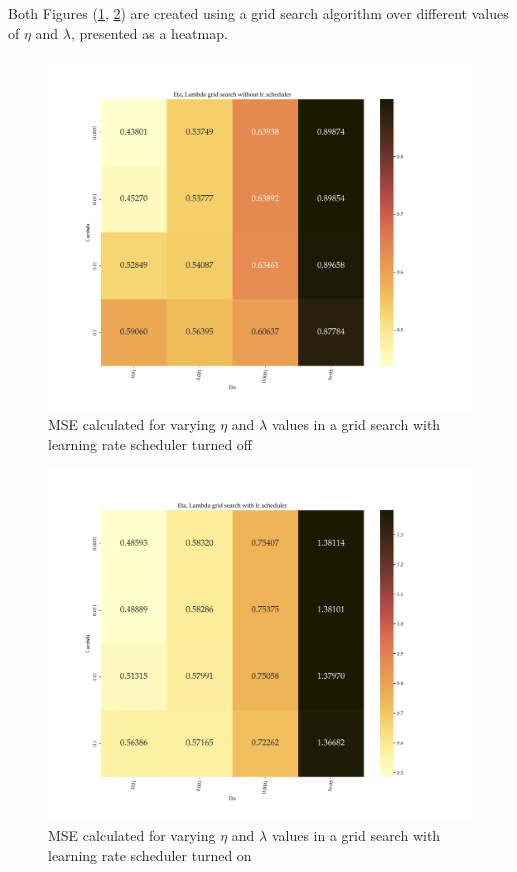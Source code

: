 \documentclass
[twocolumn,
secnumarabic,
nobibnotes,
aps,
prl,
reprint,
groupedaddress,
amsmath,
amssymb
]{revtex4-2}
\begin{document}
Both Figures (\ref{fig:a_gs}, \ref{fig:a_gslr}) are created using a grid search algorithm over different values of $\eta$ and $\lambda$, presented as a heatmap.

\begin{figure}
  \includegraphics[width=\textwidth]{figures/EX_A__gridsearch.pdf}
  \caption{\label{fig:a_gs}MSE calculated for varying $\eta$ and $\lambda$ values in a grid search with learning rate scheduler turned off}
\end{figure}

\begin{figure}
  \includegraphics[width=\textwidth]{figures/EX_A__gridsearch_withlr.pdf}
  \caption{\label{fig:a_gslr}MSE calculated for varying $\eta$ and $\lambda$ values in a grid search with learning rate scheduler turned on}
\end{figure}
\end{document}
